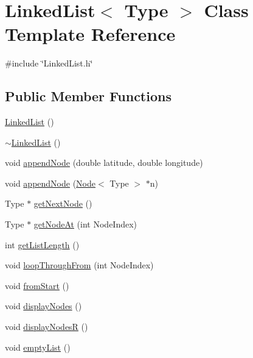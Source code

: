 \hypertarget{classLinkedList}{\section{Linked\-List$<$ Type $>$ Class Template Reference}
\label{classLinkedList}
}


{\ttfamily \#include \char`\"{}Linked\-List.\-h\char`\"{}}

\subsection*{Public Member Functions}
\begin{DoxyCompactItemize}
\item 
\hyperlink{classLinkedList_ab071ad70f21bb30297b95ce8afecb95f}{Linked\-List} ()
\item 
\hyperlink{classLinkedList_a06639bd2e85ed04bfcf004de12f19388}{$\sim$\-Linked\-List} ()
\item 
void \hyperlink{classLinkedList_a9fca2f717c8b5f078ae6fc8ac0a95368}{append\-Node} (double latitude, double longitude)
\item 
void \hyperlink{classLinkedList_af8979406b4a82460fa34e14c445c5c7a}{append\-Node} (\hyperlink{classNode}{Node}$<$ Type $>$ $\ast$n)
\item 
Type $\ast$ \hyperlink{classLinkedList_ab8b608600fb42364988187b8e3eeab6f}{get\-Next\-Node} ()
\item 
Type $\ast$ \hyperlink{classLinkedList_a4148f0279418f828045787371f18ba0f}{get\-Node\-At} (int Node\-Index)
\item 
int \hyperlink{classLinkedList_a7b75ab339c58fc2c1a01bc3a64698c1c}{get\-List\-Length} ()
\item 
void \hyperlink{classLinkedList_ad7b0612f7f7a7a03d0283fdf42b49f39}{loop\-Through\-From} (int Node\-Index)
\item 
void \hyperlink{classLinkedList_a51f7c1e5fe8475c37ecd59b6f89d0b32}{from\-Start} ()
\item 
void \hyperlink{classLinkedList_ad837f86ed46df0d0b5a997b26b7ad7d2}{display\-Nodes} ()
\item 
void \hyperlink{classLinkedList_a56d026585684202f55c24d66400b586d}{display\-Nodes\-R} ()
\item 
void \hyperlink{classLinkedList_a731332e9de2b55ddbdd402bdc0e02930}{empty\-List} ()
\end{DoxyCompactItemize}
